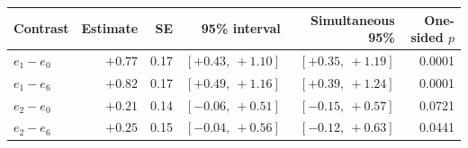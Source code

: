 \begin{tabular}{lrrrrr}
\toprule
Contrast & Estimate & SE & 95\% interval & Simultaneous 95\% & One-sided $p$ \\
\midrule
$e_1-e_0$ & $+0.77$ & 0.17 & $[+0.43,\ +1.10]$ & $[+0.35,\ +1.19]$ & 0.0001 \\
$e_1-e_6$ & $+0.82$ & 0.17 & $[+0.49,\ +1.16]$ & $[+0.39,\ +1.24]$ & 0.0001 \\
$e_2-e_0$ & $+0.21$ & 0.14 & $[-0.06,\ +0.51]$ & $[-0.15,\ +0.57]$ & 0.0721 \\
$e_2-e_6$ & $+0.25$ & 0.15 & $[-0.04,\ +0.56]$ & $[-0.12,\ +0.63]$ & 0.0441 \\
\bottomrule
\end{tabular}
